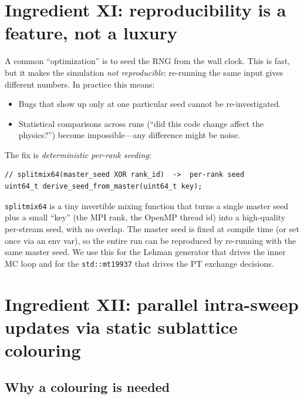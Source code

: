 \documentclass[11pt,letterpaper]{article}
\begin{document}
\section{Ingredient XI: reproducibility is a feature, not a luxury}
\label{sec:reproducibility}

A common ``optimization'' is to seed the RNG from the wall clock.  This
is fast, but it makes the simulation \emph{not reproducible}: re-running
the same input gives different numbers.  In practice this means:
\begin{itemize}[noitemsep]
  \item Bugs that show up only at one particular seed cannot be
        re-investigated.
  \item Statistical comparisons across runs (``did this code change
        affect the physics?'') become impossible---any difference might
        be noise.
\end{itemize}

The fix is \emph{deterministic per-rank seeding}:
\begin{lstlisting}
// splitmix64(master_seed XOR rank_id)  ->  per-rank seed
uint64_t derive_seed_from_master(uint64_t key);
\end{lstlisting}
\texttt{splitmix64} is a tiny invertible mixing function that turns a
single master seed plus a small ``key'' (the MPI rank, the OpenMP
thread id) into a high-quality per-stream seed, with no overlap.  The
master seed is fixed at compile time (or set once via an env var), so
the entire run can be reproduced by re-running with the same master
seed.  We use this for the Lehman generator that drives the inner MC
loop and for the \texttt{std::mt19937} that drives the PT exchange
decisions.

\section{Ingredient XII: parallel intra-sweep updates via static
sublattice colouring}
\label{sec:sublattice-colour}

\subsection{Why a colouring is needed}
\end{document}
